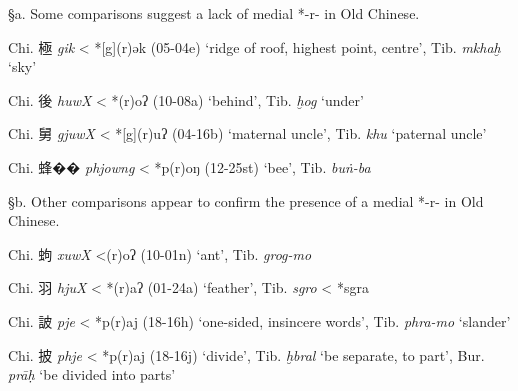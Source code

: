 §a. Some comparisons suggest a lack of medial *-r- in Old Chinese.

\begin{description} \item
Chi. 極 \emph{gik} \textless{} *[g](r)ək (05-04e) `ridge of roof,
highest point, centre', Tib. {} \emph{mkhaḫ} `sky'

\item
Chi. 後 \emph{huwX} \textless{} *{}(r)oʔ (10-08a) `behind', Tib. {} \emph{ḫog} `under'

\item
Chi. 舅 \emph{gjuwX} \textless{} *[g](r)uʔ (04-16b) `maternal
uncle', Tib. {} \emph{khu} `paternal uncle'

\item
Chi. 蜂�� \emph{phjowng} \textless{} *p{}(r)oŋ (12-25st) `bee', Tib. {}
\emph{buṅ-ba}
\end{description}

§b. Other comparisons appear to confirm the presence of a medial *-r- in
Old Chinese.

\begin{description} \item
Chi. 蚼 \emph{xuwX} \textless{}{}{}(r)oʔ (10-01n) `ant', Tib. {} \emph{grog-mo}

\item
Chi. 羽 \emph{hjuX} \textless{} *{}(r)aʔ (01-24a) `feather', Tib. {} \emph{sgro} \textless{} *sg{}ra

\item
Chi. 詖 \emph{pje} \textless{} *p(r)aj (18-16h) `one-sided, insincere
words', Tib. {} \emph{phra-mo} `slander'

\item
Chi. 披 \emph{phje }\textless{} *p{}(r)aj (18-16j) `divide', Tib. {} \emph{ḫbral} `be separate, to part', Bur. {} \emph{prāḥ} `be divided
into parts'
\end{description}

